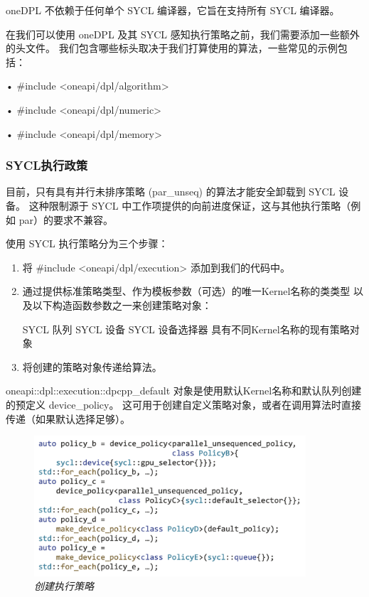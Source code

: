 oneDPL 不依赖于任何单个 SYCL 编译器，它旨在支持所有 SYCL 编译器。

在我们可以使用 oneDPL 及其 SYCL 感知执行策略之前，我们需要添加一些额外的头文件。 
我们包含哪些标头取决于我们打算使用的算法，一些常见的示例包括：

• \#include <oneapi/dpl/algorithm>

• \#include <oneapi/dpl/numeric>

• \#include <oneapi/dpl/memory>

\subsubsection{SYCL执行政策}
目前，只有具有并行未排序策略 (par\_unseq) 的算法才能安全卸载到 SYCL 设备。 
这种限制源于 SYCL 中工作项提供的向前进度保证，这与其他执行策略（例如 par）的要求不兼容。

使用 SYCL 执行策略分为三个步骤：

\begin{enumerate}
	\item 将 \#include <oneapi/dpl/execution> 添加到我们的代码中。

	\item 通过提供标准策略类型、作为模板参数（可选）的唯一Kernel名称的类类型
	以及以下构造函数参数之一来创建策略对象：

		SYCL 队列 SYCL 设备 SYCL 设备选择器 具有不同Kernel名称的现有策略对象

	\item 将创建的策略对象传递给算法。
\end{enumerate}

oneapi::dpl::execution::dpcpp\_default 对象是使用默认Kernel名称和默认队列创建的预定义 device\_policy。 
这可用于创建自定义策略对象，或者在调用算法时直接传递（如果默认选择足够）。

\begin{figure}[H]
	\centering
	\includegraphics[width=0.9\textwidth]{figs/F18.5.png}
	\caption{\textit{创建执行策略 }}
\end{figure}


